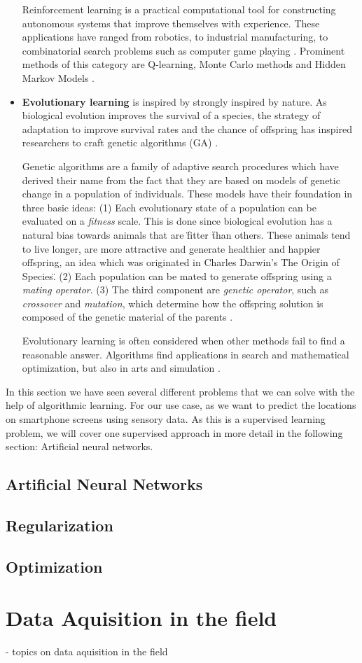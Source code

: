 \begin{itemize}
 Reinforcement learning is a practical computational tool for constructing autonomous systems that improve themselves with experience. These applications have ranged from robotics, to industrial manufacturing, to combinatorial search problems such
as computer game playing \cite{kaelbling1996reinforcement}. 
Prominent methods of this category are Q-learning, Monte Carlo
methods and Hidden Markov Models \cite{Marsland:2009:MLA:1571643}.\\

  \item[] \textbf{Evolutionary learning} is inspired by strongly inspired by nature. As biological evolution improves the survival of a species, the strategy of adaptation to improve survival rates and the chance of offspring has inspired researchers to craft genetic algorithms (GA) \cite{Marsland:2009:MLA:1571643}. 

Genetic algorithms are a family of adaptive search procedures which have derived their name from the fact that they are based on models of genetic change in a population of individuals. These models have their foundation in three basic ideas: (1) Each evolutionary state of a population can be evaluated on a \textit{fitness} scale. This is done since biological evolution has a natural bias towards animals that are \" fitter \" than others. These animals tend to live longer, are more attractive and generate healthier and happier offspring, an idea which was originated in Charles Darwin's \"The Origin of Species\". (2) Each population can be mated to generate offspring using a \textit{mating operator}. (3) The third component are \textit{genetic operator}, such as \textit{crossover} and \textit{mutation}, which determine how the offspring solution is composed of the genetic material of the parents \cite{de1988learning}.

Evolutionary learning is often considered when other methods fail to find a reasonable answer. Algorithms find applications in search and mathematical optimization, but also in arts and simulation \cite{Marsland:2009:MLA:1571643}.\\
\end{itemize}

In this section we have seen several different problems that we can solve with the help of algorithmic learning. For our use case, as we want to predict the locations on smartphone screens using sensory data. As this is a supervised learning problem, we will cover one supervised approach in more detail in the following section: Artificial neural networks.

\subsection{Artificial Neural Networks}

\subsection{Regularization}
\subsection{Optimization}


\section{Data Aquisition in the field \label{sec:fieldstudy}}
- topics on data aquisition in the field